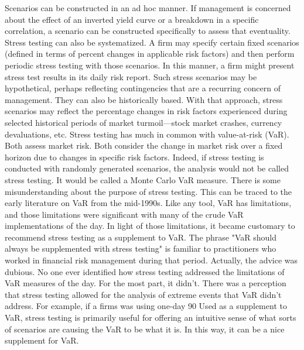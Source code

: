 Scenarios can be constructed in an ad hoc manner. If management is concerned about the effect of an inverted yield curve or a breakdown in a specific correlation, a scenario can be constructed specifically to assess that eventuality. Stress testing can also be systematized. A firm may specify certain fixed scenarios (defined in terms of percent changes in applicable risk factors) and then perform periodic stress testing with those scenarios. In this manner, a firm might present stress test results in its daily risk report. Such stress scenarios may be hypothetical, perhaps reflecting contingencies that are a recurring concern of management. They can also be historically based. With that approach, stress scenarios may reflect the percentage changes in risk factors experienced during selected historical periods of market turmoil—stock market crashes, currency devaluations, etc.
Stress testing has much in common with value-at-risk (VaR). Both assess market risk. Both consider the change in market risk over a fixed horizon due to changes in specific risk factors. Indeed, if stress testing is conducted with randomly generated scenarios, the analysis would not be called stress testing. It would be called a Monte Carlo VaR measure.
There is some misunderstanding about the purpose of stress testing. This can be traced to the early literature on VaR from the mid-1990s. Like any tool, VaR has limitations, and those limitations were significant with many of the crude VaR implementations of the day. In light of those limitations, it became customary to recommend stress testing as a supplement to VaR. The phrase "VaR should always be supplemented with stress testing" is familiar to practitioners who worked in financial risk management during that period. Actually, the advice was dubious. No one ever identified how stress testing addressed the limitations of VaR measures of the day. For the most part, it didn't.
There was a perception that stress testing allowed for the analysis of extreme events that VaR didn't address. For example, if a firms was using one-day 90%
Used as a supplement to VaR, stress testing is primarily useful for offering an intuitive sense of what sorts of scenarios are causing the VaR to be what it is. In this way, it can be a nice supplement for VaR.
 
